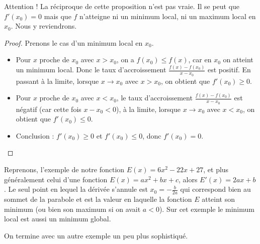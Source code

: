 \documentclass[11pt,class=report,crop=false]{standalone}
\begin{document}
Attention ! La réciproque de cette proposition n'est pas vraie. Il se peut que $f'(x_0)=0$ mais que $f$ n'atteigne ni un minimum local, ni un maximum local en $x_0$. Nous y reviendrons.

\begin{proof}
Prenons le cas d'un minimum local en $x_0$.
\begin{itemize}
  \item Pour $x$ proche de $x_0$ avec $x>x_0$, on a $f(x_0) \le f(x)$, car en $x_0$ on atteint un minimum local. Donc le taux d'accroissement $\frac{f(x)-f(x_0)}{x-x_0}$ est positif. En passant à la limite, lorsque $x \to x_0$ avec $x>x_0$, on obtient que $f'(x_0) \ge 0$.
  \item Pour $x$ proche de $x_0$ avec $x<x_0$, le taux d'accroissement $\frac{f(x)-f(x_0)}{x-x_0}$ est négatif (car cette fois $x-x_0<0$), à la limite, 
 lorsque $x \to x_0$ avec $x<x_0$, on obtient que $f'(x_0) \le 0$.
 \item Conclusion : $f'(x_0) \ge 0$ et $f'(x_0) \le 0$, donc $f'(x_0)=0$.
\end{itemize}
\end{proof}


Reprenons, l'exemple de notre fonction $E(x) = 6x^2-22x+27$, et plus généralement celui d'une fonction $E(x) = ax^2+bx+c$, alors $E'(x)=2ax+b$. Le seul point en lequel la dérivée s'annule est $x_0 = -\frac{b}{2a}$ qui correspond bien au sommet de la parabole et est la valeur en laquelle la fonction $E$ atteint son minimum (ou bien son maximum si on avait $a<0$). Sur cet exemple le minimum local est aussi un minimum global.

On termine avec un autre exemple un peu plus sophistiqué.
\end{document}
